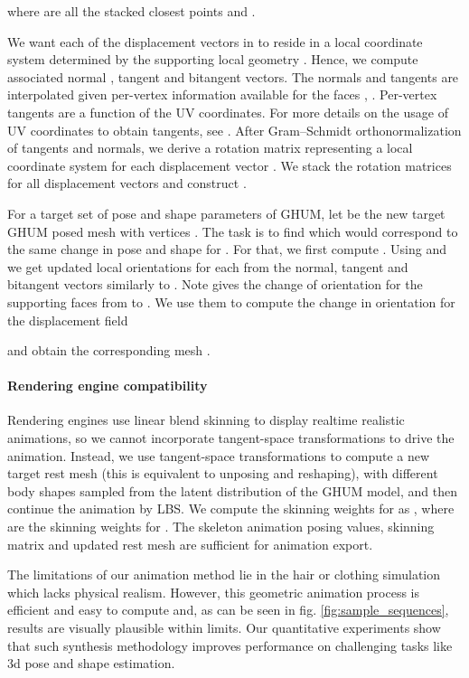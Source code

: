 \documentclass[10pt,twocolumn,letterpaper]{article}
\begin{document}
where  are all the stacked closest points  and . 

We want each of the displacement vectors  in  to reside in a local coordinate system determined by the supporting local geometry . Hence, we compute associated normal , tangent  and bitangent  vectors. The normals and tangents are interpolated given per-vertex information available for the faces , . Per-vertex tangents are a function of the UV coordinates. For more details on the usage of UV coordinates to obtain tangents, see \cite{premecz2006iterative}. After Gram–Schmidt orthonormalization of tangents and normals, we derive a rotation matrix  representing a local coordinate system for each displacement vector . We stack the rotation matrices for all displacement vectors and construct .

 For a target set of pose and shape parameters  of GHUM, let  be the new target GHUM posed mesh with vertices . The task is to find  which would correspond to the same change in pose and shape for . For that, we first compute . Using  and  we get updated local orientations  for each  from the normal, tangent and bitangent vectors similarly to . Note  gives the change of orientation for the supporting faces  from  to . We use them to compute the change in orientation for the displacement field  

and obtain the corresponding mesh . 

\paragraph{Rendering engine compatibility} Rendering engines use linear blend skinning to display realtime realistic animations, so we cannot incorporate tangent-space transformations to drive the animation. Instead, we use tangent-space transformations to compute a new target rest mesh (this is equivalent to unposing and reshaping), with different body shapes sampled from the latent distribution of the GHUM model, and then continue the animation by LBS. We compute the skinning weights for  as , where  are the skinning weights for . The skeleton animation posing values, skinning matrix  and updated rest mesh  are sufficient for animation export.

The limitations of our animation method lie in the hair or clothing simulation which lacks physical realism. However, this geometric animation process is efficient and easy to compute and, as can be seen in fig. \ref{fig:sample_sequences}, results are visually plausible within limits. Our quantitative experiments show that such synthesis methodology improves performance on challenging tasks like 3d pose and shape estimation.
\end{document}
